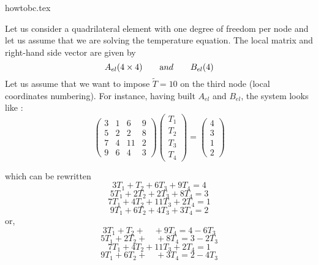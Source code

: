 
\begin{flushright} {\tiny {\color{gray} howtobc.tex}} \end{flushright}

Let us consider a quadrilateral element with one degree of freedom per node and let us assume that we are solving the temperature equation. The local matrix and right-hand side vector are given by 
\[
A_{el}(4\times 4) \quad\quad {\text and} \quad\quad B_{el}(4)
\]
Let us assume that we want to impose $\tilde{T}=10$ on the third node (local coordinates numbering). For instance, having built $A_{el}$ and $B_{el}$, the system looks like :
\[
\left(
\begin{array}{cccc}
3 & 1 & 6  & 9 \\
5 & 2 & 2  & 8 \\
7 & 4 & 11 & 2 \\
9 & 6 & 4  & 3
\end{array}
\right)
\left(
\begin{array}{c}
T_1 \\ T_2 \\ T_3 \\ T_4
\end{array}
\right)
=
\left(
\begin{array}{c}
4 \\ 3 \\ 1 \\ 2
\end{array}
\right)
\]



which can be rewritten 
\[
3 T_1 + T_2 + 6 T_3 + 9 T_4 = 4
\]
\[
5 T_1 + 2T_2 + 2 T_3 + 8 T_4 = 3
\]
\[
7 T_1 + 4T_2 + 11 T_3 + 2 T_4 = 1
\]
\[
9 T_1 + 6T_2 + 4 T_3 + 3 T_4 = 2
\]
or, 
\[
3 T_1 + T_2 + \quad  + 9 T_4 = 4 - 6T_3
\]
\[
5 T_1 + 2T_2 + \quad + 8 T_4 = 3 - 2T_3
\]
\[
7 T_1 + 4T_2 + 11T_3 + 2 T_4 = 1 
\]
\[
9 T_1 + 6T_2 + \quad + 3 T_4 = 2 - 4T_3
\]


